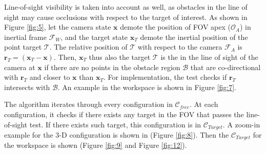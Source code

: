 \documentclass[12pt,draftcls,onecolumn]{IEEEtran}
\begin{document}
Line-of-sight visibility is taken into account as well, as obstacles in the line of sight may cause occlusions with respect to the target of interest. 
As shown in Figure \ref{fig:5}, let the camera state $\mathbf{x}$ demote the position of FOV apex ($\mathcal{O}_{A}$) in inertial frame  $\mathcal{F}_{W}$, and the target state  $\mathbf{x}_{T}$ demote the inertial position of the point target $\mathcal{T}$. 
The relative position of  $\mathcal{T}$ with respect to the camera  $\mathcal{F}_{A}$ is $\mathbf{r}_{T} = (\mathbf{x}_{T} - \mathbf{x})$.
Then, $\mathbf{x}_{T}$ thus also the target $\mathcal{T}$ is the in the line of sight of the camera at $\mathbf{x}$ if there are no points in the obstacle region $\mathcal{B}$ that are co-directional with  $\mathbf{r}_{T}$ and closer to $\mathbf{x}$ than $\mathbf{x}_{T}$. 
For implementation, the test checks if $\mathbf{r}_{T}$ intersects with $\mathcal{B}$.
An example in the workspace is shown in Figure \ref{fig:7}.


The algorithm iterates through every configuration in $\mathcal{C}_{free}$.
At each configuration, it checks if there exists any target in the FOV that passes the line-of-sight test.
If there exists such target, this configuration is in $\mathcal{C}_{Target}$.
A zoom-in example for the 3-D configuration is shown in (Figure \ref{fig:8}).
Then the $\mathcal{C}_{Target}$ for the workspace is shown (Figure \ref{fig:9} and Figure \ref{fig:12}).
\end{document}
